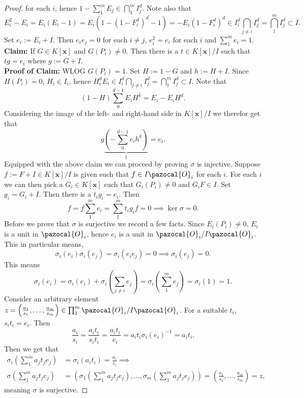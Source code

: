 \begin{proof}
    for each $i$, hence $1-\sum_1^m E_j\in \bigcap_1^m I_j^d$. Note also that 
    $$E_i^2-E_i = E_i(E_i-1)=E_i(1-(1-F_i^d)^d-1)=-E_i(1-F_i^d)^d\in I_i^d\bigcap_{j\neq i} I_j^d =\bigcap_1^m I_j^d \subset I.$$
    Set $e_i := E_i+I$. Then $e_ie_j=0$ for each $i\neq j$, $e_i^2 = e_i$ for each $i$ and $\sum_1^m e_i = 1$.\\ 
    \textbf{Claim:} If $G\in K[\mathbf{x}]$ and $G(P_i)\neq 0$. Then there is a $t\in K[\mathbf{x}]/I$ such that $tg = e_i$ where $g := G+I$.\\
    \textbf{Proof of Claim:} WLOG $G(P_i)=1$. Set $H:=1-G$ and $h:= H+I$.
    Since $H(P_i)=0$, $H_i\in I_i$, hence $H_i^dE_i\in I_i^d\bigcap_{j\neq i} I_j^d = \bigcap_1^m I_j^d \subset I$.  Note that 
    $$(1-H)\sum_0^{d-1}E_iH^k = E_i-E_iH^d.$$
    Considering the image of the left- and right-hand side in $K[\mathbf{x}]/I$ we therefor get that 
    $$g\underbrace{\left(-\sum_0^{d-1} e_ih^k\right)}_t = e_i.$$
    Equipped with the above claim we can proceed by proving $\sigma$ is injective. Suppose $f:=F+I\in K[\mathbf{x}]/I$ is given such that $f\in I\pazocal{O}_i$ for each $i$. For each $i$ we can then pick a $G_i\in K[\mathbf{x}]$ such that $G_i(P_i)\neq 0$ and $G_iF\in I $. Set $g_i = G_i + I$. Then there is a $t_ig_i=e_i$. Then 
    $$f = f\sum_1^m e_i = \sum_1^m t_ig_if = 0 \implies \ker \sigma =0.$$
    Before we prove that $\sigma$ is surjective we record a few facts. Since $E_i(P_i)\neq 0$, $E_i$ is a unit in $\pazocal{O}_i$, hence $e_i$ is a unit in $\pazocal{O}_i/I\pazocal{O}_i$. This in particular means, 
    $$\sigma_i(e_i)\sigma_i(e_j)=\sigma_i(e_ie_j)=0\implies \sigma_i(e_j)=0.$$
    This means 
    $$\sigma_i(e_i)=\sigma_i(e_i)+\sigma_i\left(\sum_{j\neq i} e_j\right )=\sigma_i\left(\sum_1^m e_j\right)=\sigma_i(1)=1.$$
    Consider an arbitrary element $z=\left(\frac{a_1}{s_1},\dots,\frac{a_m}{s_m}\right)\in \prod_1^m \pazocal{O}_i/I\pazocal{O}_i$. For a suitable $t_i$, $s_it_i = e_i$. Then 
    $$\frac{a_i}{s_i}=\frac{a_it_i}{s_it_i} = \frac{a_it_i}{e_i} = a_it_i \sigma_i(e_i)^{-1}=a_it_i.$$
    Then we get that 
    \begin{align*}
        \sigma_i\left(\sum_1^m a_jt_je_j\right) &= \sigma_i(a_it_i)=\frac{a_i}{s_i}\implies\\ \sigma\left(\sum_1^m a_jt_je_j\right)&=\left(\sigma_1\left(\sum_1^m a_jt_je_j\right),\dots,\sigma_m\left( \sum_1^m a_jt_je_j\right)\right) = \left(\frac{a_1}{s_1},\dots,\frac{a_m}{s_m}\right) = z,
    \end{align*}
    meaning $\sigma$ is surjective. 
  \end{proof}
